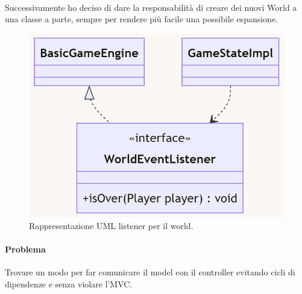 \documentclass[a4paper,12pt]{report}
\begin{document}
\paragraph{} Successivamente ho deciso di dare la responsabilità di creare dei nuovi World a una classe a parte, sempre per rendere più facile una possibile espansione.
%
\begin{figure}[H]
	\centering{}
	\includegraphics[scale=0.60]{img/worldEventListener.png}
	\caption{Rappresentazione UML listener per il world.}
	\end{figure}
%
\paragraph*{Problema} Trovare un modo per far comunicare il model con il controller evitando cicli di dipendenze e senza violare l’MVC.
\end{document}
